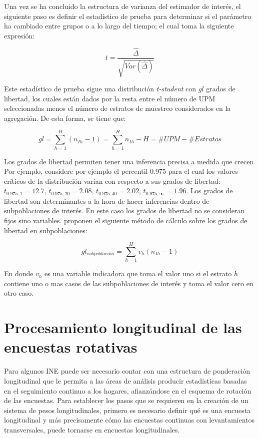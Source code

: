\documentclass[
  12pt,
]{book}
\begin{document}
Una vez se ha concluido la estructura de varianza del estimador de
interés, el siguiente paso es definir el estadístico de prueba para determinar si el parámetro ha cambiado entre grupos o a lo largo del tiempo; el cual toma la siguiente expresión:

\[
t = \frac{\hat{\Delta}}{\sqrt{Var(\hat{\Delta})}}
\]

Este estadístico de prueba sigue una distribución \emph{t-student} con \(gl\)
grados de libertad, los cuales están dados por la resta entre el número de UPM
seleccionadas menos el número de estratos de muestreo considerados en la agregación. De
esta forma, se tiene que:

\[
gl = \sum_{h=1}^H (n_{Ih} - 1) = \sum_{h=1}^H n_{Ih} - H = \#UPM - \#Estratos
\]

Los grados de libertad permiten tener una inferencia precisa a medida
que crecen. Por ejemplo, considere por ejemplo el percentil 0.975 para
el cual los valores críticos de la distribución varían con respecto a
sus grados de libertad: \(t_{0.975, 1}=12.7\), \(t_{0.975, 20}=2.08\),
\(t_{0.975, 40}=2.02\), \(t_{0.975, \infty}=1.96\). Los grados de libertad
son determinantes a la hora de hacer inferencias dentro de
subpoblaciones de interés. En este caso los grados de libertad no se
consideran fijos sino variables. \citet{Korn_Graubard_1999} proponen el
siguiente método de cálculo sobre los grados de libertad en
subpoblaciones:

\[
gl_{subpoblación} = \sum_{h=1}^H v_h(n_{Ih} - 1)
\]

En donde \(v_h\) es una variable indicadora que toma el valor uno si el
estrato \(h\) contiene uno o mas casos de las subpoblaciones de interés y
toma el valor cero en otro caso.

\hypertarget{procesamiento-longitudinal-de-las-encuestas-rotativas}{%
\chapter{Procesamiento longitudinal de las encuestas rotativas}\label{procesamiento-longitudinal-de-las-encuestas-rotativas}}

Para algunos INE puede ser necesario contar con una estructura de ponderación longitudinal que le permita a las áreas de análisis producir estadísticas basadas en el seguimiento continuo a los hogares, afianzándose en el esquema de rotación de las encuestas. Para establecer los pasos que se requieren en la creación de un sistema de pesos longitudinales, primero es necesario definir qué es una encuesta longitudinal y más precisamente cómo las encuestas continuas con levantamientos transversales, puede tornarse en encuestas longitudinales.
\end{document}
